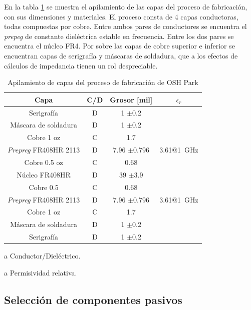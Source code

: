 En la tabla \ref{tab:oshpark_4_layer_stackup} se muestra el apilamiento de las
capas del proceso de fabricación, con sus dimensiones y materiales. El proceso
consta de 4 capas conductoras, todas compuestas por cobre. Entre ambos pares de
conductores se encuentra el \textit{prepeg} de constante dieléctrica estable en
frecuencia. Entre los dos pares se encuentra el núcleo FR4. Por sobre las capas de
cobre superior e inferior se encuentran capas de serigrafía y máscaras de
soldadura, que a los efectos de cálculos de impedancia tienen un rol
despreciable.

\begin{table}[htbp]
\centering
\begin{threeparttable}[b]
    \begin{tabular}{c|c|c|c}
        Capa & C/D \tnote{a} & Grosor [mil]  & $\epsilon_r$ \tnote{b} \\
        \hline
        Serigrafía & D & 1 $\pm$0.2 & \\
        Máscara de soldadura & D & 1 $\pm$0.2 & \\
        Cobre 1 oz & C & 1.7 \\
        \textit{Prepreg} FR408HR 2113  & D & 7.96 $\pm$0.796 &
        3.61@\qty{1}{\giga\hertz} \\
        Cobre 0.5 oz & C & 0.68 & \\
        Núcleo FR408HR & D & 39 $\pm$3.9 & \\
        Cobre 0.5 & C & 0.68 \\
        \textit{Prepreg} FR408HR 2113 & D & 7.96 $\pm$0.796 &
        3.61@\qty{1}{\giga\hertz}\\
        Cobre 1 oz & C & 1.7 & \\
        Máscara de soldadura & D & 1 $\pm$0.2 & \\
        Serigrafía & D & 1 $\pm$0.2 & \\
    \end{tabular}
    \begin{tablenotes}
        \item [a] Conductor/Dieléctrico.
        \item [a] Permisividad relativa.
    \end{tablenotes}
\end{threeparttable}
\caption{Apilamiento de capas del proceso de fabricación de OSH Park}
\label{tab:oshpark_4_layer_stackup}
\end{table}

\subsection{Selección de componentes pasivos}

